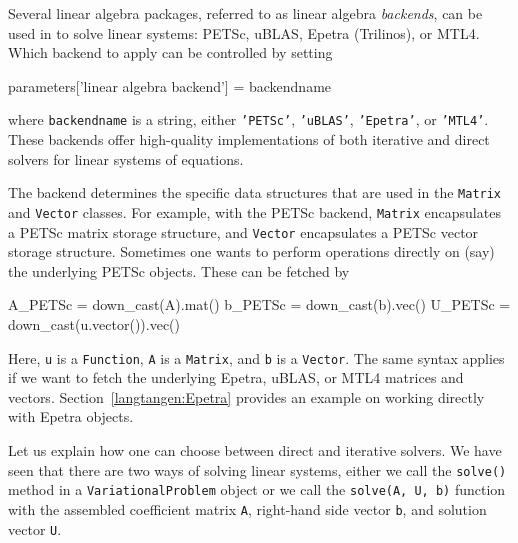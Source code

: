 Several linear algebra packages, referred to as
linear algebra \emph{backends}, can be used in \fenics{} to solve
linear systems:
PETSc, uBLAS, Epetra (Trilinos), or MTL4.
Which backend to apply can be controlled by setting
\begin{python}
parameters['linear algebra backend'] = backendname
\end{python} 
where {\fontsize{10pt}{10pt}\texttt{backendname}} is a string, either {\fontsize{10pt}{10pt}\texttt{'PETSc'}},
{\fontsize{10pt}{10pt}\texttt{'uBLAS'}}, {\fontsize{10pt}{10pt}\texttt{'Epetra'}}, or {\fontsize{10pt}{10pt}\texttt{'MTL4'}}.
These backends offer high-quality implementations of both iterative
and direct solvers for linear systems of equations.

The backend determines the specific data structures that are
used in the {\fontsize{10pt}{10pt}\texttt{Matrix}} and {\fontsize{10pt}{10pt}\texttt{Vector}} classes. For example,
with the PETSc backend, {\fontsize{10pt}{10pt}\texttt{Matrix}} encapsulates a
PETSc matrix storage structure, and
{\fontsize{10pt}{10pt}\texttt{Vector}} encapsulates a PETSc vector storage structure.
Sometimes one wants to perform operations directly on (say) the 
underlying PETSc objects. These can be fetched by
\begin{python}
A_PETSc = down_cast(A).mat()
b_PETSc = down_cast(b).vec()
U_PETSc = down_cast(u.vector()).vec()
\end{python}
Here, {\fontsize{10pt}{10pt}\texttt{u}} is a {\fontsize{10pt}{10pt}\texttt{Function}}, {\fontsize{10pt}{10pt}\texttt{A}} is a {\fontsize{10pt}{10pt}\texttt{Matrix}},
and {\fontsize{10pt}{10pt}\texttt{b}} is a {\fontsize{10pt}{10pt}\texttt{Vector}}.
The same syntax applies if we want to fetch
the underlying Epetra, uBLAS, or MTL4 matrices and vectors.
Section~\ref{langtangen:Epetra} provides an example on working directly with
Epetra objects.


Let us explain how one can choose between direct and iterative solvers.
We have seen that there
are two ways of solving linear systems, either we call the {\fontsize{10pt}{10pt}\texttt{solve()}}
method in a {\fontsize{10pt}{10pt}\texttt{VariationalProblem}} object or we call the {\fontsize{10pt}{10pt}\texttt{solve(A, U, b)}}
function with the assembled coefficient matrix {\fontsize{10pt}{10pt}\texttt{A}}, 
right-hand side vector {\fontsize{10pt}{10pt}\texttt{b}}, and
solution vector {\fontsize{10pt}{10pt}\texttt{U}}. 

